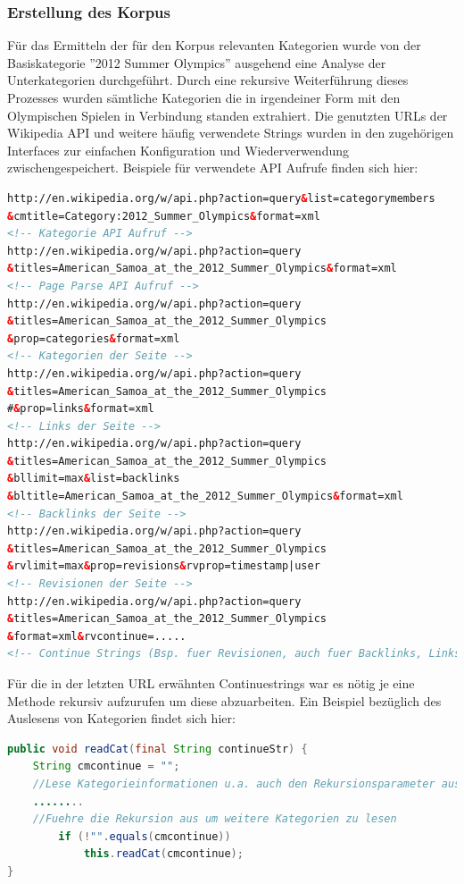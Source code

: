 \documentclass[pagesize=auto, titlepage=on]{scrartcl}
\begin{document}
\subsubsection{Erstellung des Korpus}
Für das Ermitteln der für den Korpus relevanten Kategorien wurde von der Basiskategorie ''2012 Summer Olympics'' ausgehend eine Analyse der Unterkategorien durchgeführt. Durch eine rekursive Weiterführung dieses Prozesses wurden sämtliche Kategorien die in irgendeiner Form mit den Olympischen Spielen in Verbindung standen extrahiert. Die genutzten URLs der Wikipedia API und weitere häufig verwendete Strings wurden in den zugehörigen Interfaces zur einfachen Konfiguration und Wiederverwendung zwischengespeichert. Beispiele für verwendete API Aufrufe finden sich hier:\begin{lstlisting}[language=XML]
http://en.wikipedia.org/w/api.php?action=query&list=categorymembers
&cmtitle=Category:2012_Summer_Olympics&format=xml 
<!-- Kategorie API Aufruf -->
http://en.wikipedia.org/w/api.php?action=query
&titles=American_Samoa_at_the_2012_Summer_Olympics&format=xml 
<!-- Page Parse API Aufruf -->
http://en.wikipedia.org/w/api.php?action=query
&titles=American_Samoa_at_the_2012_Summer_Olympics
&prop=categories&format=xml 
<!-- Kategorien der Seite -->
http://en.wikipedia.org/w/api.php?action=query
&titles=American_Samoa_at_the_2012_Summer_Olympics
#&prop=links&format=xml 
<!-- Links der Seite -->
http://en.wikipedia.org/w/api.php?action=query
&titles=American_Samoa_at_the_2012_Summer_Olympics
&bllimit=max&list=backlinks
&bltitle=American_Samoa_at_the_2012_Summer_Olympics&format=xml
<!-- Backlinks der Seite -->
http://en.wikipedia.org/w/api.php?action=query
&titles=American_Samoa_at_the_2012_Summer_Olympics
&rvlimit=max&prop=revisions&rvprop=timestamp|user
<!-- Revisionen der Seite -->
http://en.wikipedia.org/w/api.php?action=query
&titles=American_Samoa_at_the_2012_Summer_Olympics
&format=xml&rvcontinue=.....
<!-- Continue Strings (Bsp. fuer Revisionen, auch fuer Backlinks, Links und Kategorien benutzt)-->
\end{lstlisting}
Für die in der letzten URL erwähnten Continuestrings war es nötig je eine Methode rekursiv aufzurufen um diese abzuarbeiten. Ein Beispiel bezüglich des Auslesens von Kategorien findet sich hier:
\begin{lstlisting}[language=Java]public void readCat(final String continueStr) {
	String cmcontinue = "";
	//Lese Kategorieinformationen u.a. auch den Rekursionsparameter aus
	........
	//Fuehre die Rekursion aus um weitere Kategorien zu lesen
		if (!"".equals(cmcontinue))
			this.readCat(cmcontinue);
}\end{lstlisting}
\end{document}
